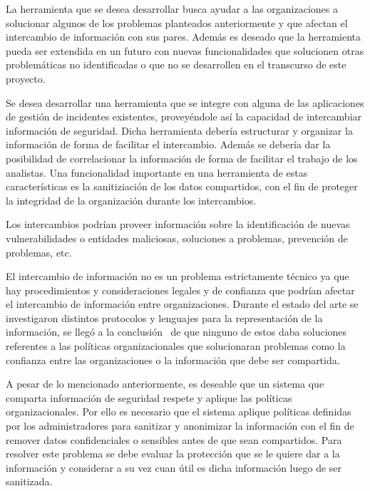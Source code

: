 \bigskip

	La herramienta que se desea desarrollar busca ayudar a las organizaciones a solucionar algunos de los problemas
	planteados anteriormente y que afectan el intercambio de información con sus pares. Además es deseado que la
	herramienta pueda ser extendida en un futuro con nuevas funcionalidades que solucionen otras problemáticas no
	identificadas o que no se desarrollen en el transcurso de este proyecto.


\bigskip

	Se desea desarrollar una herramienta que se integre con alguna de las aplicaciones de gestión de incidentes existentes,
	proveyéndole así la capacidad de intercambiar información de seguridad. Dicha herramienta debería estructurar y organizar
	la información de forma de facilitar el intercambio. Además se debería dar la posibilidad de correlacionar la
	información de forma de facilitar el trabajo de los analistas. Una funcionalidad importante en una herramienta de estas
	características es la sanitiziación de los datos compartidos, con el fin de proteger la integridad de la organización
	durante los intercambios.


\bigskip

	Los intercambios podrían proveer información sobre la identificación de nuevas vulnerabilidades o entidades maliciosas,
	soluciones a problemas, prevención de problemas, etc. 


\bigskip

	El intercambio de información no es un problema estrictamente técnico ya que hay procedimientos y consideraciones legales y de
	confianza que podrían afectar el intercambio de información entre organizaciones. Durante el estado del arte se
	investigaron distintos protocolos y lenguajes para la representación de la información, se llegó a la conclusión \ de
	que ninguno de estos daba soluciones referentes a las políticas organizacionales que solucionaran problemas como la
	confianza entre las organizaciones o la información que debe ser compartida.


\bigskip

	A pesar de lo mencionado anteriormente, es deseable que un sistema que comparta información de seguridad respete y
	aplique las políticas organizacionales. Por ello es necesario que el sistema aplique políticas definidas por los
	administradores para sanitizar y anonimizar la información con el fin de remover datos confidenciales o sensibles antes
	de que sean compartidos. Para resolver este problema se debe evaluar la protección que se le quiere dar a la
	información y considerar a su vez cuan útil es dicha información luego de ser sanitizada.\\

